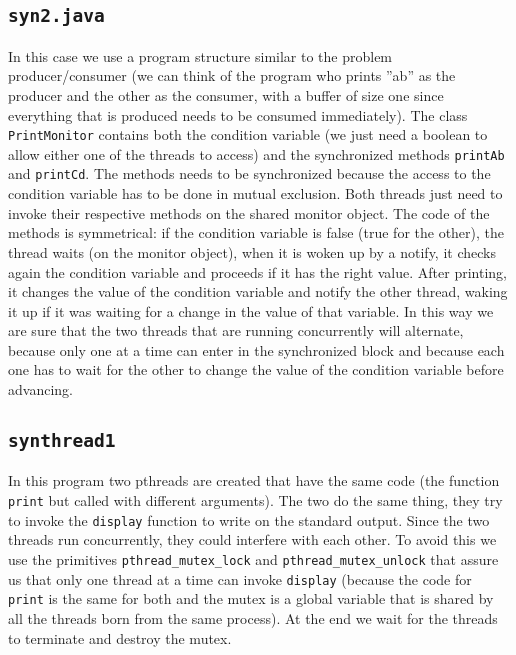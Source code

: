 \subsection{\texttt{syn2.java}}
In this case we use a program structure similar to the problem producer/consumer (we can think of the program who prints ''ab'' as the producer and the other as the consumer, with a buffer of size one since everything that is produced needs to be consumed immediately). \newline
The class \texttt{PrintMonitor} contains both the condition variable (we just need a boolean to allow either one of the threads to access) and the synchronized methods \texttt{printAb} and \texttt{printCd}. The methods needs to be synchronized because the access to the condition variable has to be done in mutual exclusion. \newline
Both threads just need to invoke their respective methods on the shared monitor object. The code of the methods is symmetrical: if the condition variable is false (true for the other), the thread waits (on the monitor object), when it is woken up by a notify, it checks again the condition variable and proceeds if it has the right value. After printing, it changes the value of the condition variable and notify the other thread, waking it up if it was waiting for a change in the value of that variable. In this way we are sure that the two threads that are running concurrently will alternate, because only one at a time can enter in the synchronized block and because each one has to wait for the other to change the value of the condition variable before advancing.
\subsection{\texttt{synthread1}}
In this program two pthreads are created that have the same code (the function \texttt{print} but called with different arguments). The two do the same thing, they try to invoke the \texttt{display} function to write on the standard output. Since the two threads run concurrently, they could interfere with each other. To avoid this we use the primitives \texttt{pthread_mutex_lock} and \texttt{pthread_mutex_unlock} that assure us that only one thread at a time can invoke \texttt{display} (because the code for \texttt{print} is the same for both and the mutex is a global variable that is shared by all the threads born from the same process). At the end we wait for the threads to terminate and destroy the mutex.
